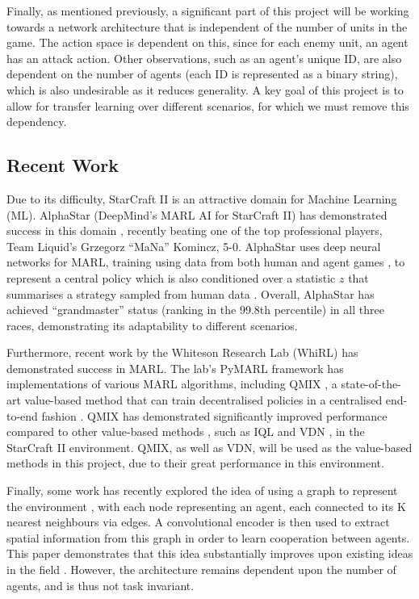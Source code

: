 Finally, as mentioned previously, a significant part of this project will be working towards a network architecture that is independent of the number of units in the game. The action space is dependent on this, since for each enemy unit, an agent has an attack action. Other observations, such as an agent's unique ID, are also dependent on the number of agents (each ID is represented as a binary string), which is also undesirable as it reduces generality. A key goal of this project is to allow for transfer learning over different scenarios, for which we must remove this dependency.

\subsection{Recent Work}

Due to its difficulty, StarCraft II is an attractive domain for Machine Learning (ML). AlphaStar (DeepMind's MARL AI for StarCraft II) has demonstrated success in this domain \cite{alphastar}, recently beating one of the top professional players, Team Liquid’s Grzegorz ``MaNa'' Komincz, 5-0. AlphaStar uses deep neural networks for MARL, training using data from both human and agent games \cite{alphastar}, to represent a central policy which is also conditioned over a statistic $z$ that summarises a strategy sampled from human data \cite{alphastar}. Overall, AlphaStar has achieved ``grandmaster'' status (ranking in the 99.8th percentile) in all three races, demonstrating its adaptability to different scenarios.


Furthermore, recent work by the Whiteson Research Lab (WhiRL) has demonstrated success in MARL. The lab's PyMARL framework \cite{smac} has implementations of various MARL algorithms, including QMIX \cite{qmixcite}, a state-of-the-art value-based method that can train decentralised policies in a centralised end-to-end fashion \cite{qmixcite}. QMIX has demonstrated significantly improved performance compared to other value-based methods \cite{qmixcite}, such as IQL \cite{IQL} and VDN \cite{vdn}, in the StarCraft II environment. QMIX, as well as VDN, will be used as the value-based methods in this project, due to their great performance in this environment.

Finally, some work has recently explored the idea of using a graph to represent the environment \cite{graph}, with each node representing an agent, each connected to its K nearest neighbours via edges. A convolutional encoder is then used to extract spatial information from this graph in order to learn cooperation between agents. This paper demonstrates that this idea substantially improves upon existing ideas in the field \cite{graph}. However, the architecture remains dependent upon the number of agents, and is thus not task invariant.



